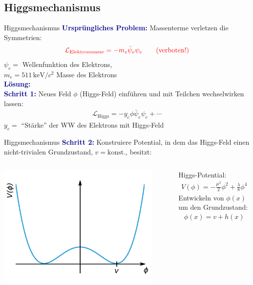 \documentclass[hyperref={pdfpagelabels=false},ngerman]{beamer}
\newcommand{\Lagr}{\mathcal{L}}
\renewcommand{\emph}[1]{\textbf{\textcolor{darkblue}{#1}}}
\begin{document}
\subsection{Higgsmechanismus}

\begin{frame}{Higgsmechanismus}
  \emph{Ursprüngliches Problem:} Massenterme verletzen die Symmetrien:
  \begin{align*}
    \textcolor{red}{\Lagr_{\text{Elektronmasse}} =
    - m_e \bar{\psi}_e \psi_e \qquad (\text{verboten!})}
  \end{align*}
  $\psi_e =$ Wellenfunktion des Elektrons,\\
  $m_e = 511\,\text{keV}/c^2$ Masse des Elektrons
  \\[1em]
  \emph{Lösung:}\\ \emph{Schritt 1:}
  Neues Feld $\phi$ (Higgs-Feld) einführen und mit Teilchen
  wechselwirken lassen:
  \begin{align*}
    \Lagr_{\text{Higgs}} = - y_e \phi \bar{\psi}_e \psi_e + \cdots
  \end{align*}
  $y_e =$ ``Stärke'' der WW des Elektrons mit Higgs-Feld
\end{frame}

\begin{frame}{Higgsmechanismus}
  \emph{Schritt 2:} Konstruiere Potential, in dem das Higgs-Feld einen
  nicht-trivialen Grundzustand, $v=\text{konst}.$, besitzt:
  \begin{columns}
    \begin{center}
      \includegraphics[width=0.9\textwidth]{images/higgs-potential}
    \end{center}
    Higgs-Potential:
    \begin{align*}
      V(\phi) = -\frac{\mu^2}{2} \phi^2 + \frac{\lambda}{8}\phi^4
    \end{align*}
    Entwickeln von $\phi(x)$ um den Grundzustand:
    \begin{align*}
      \phi(x) = v + h(x)
    \end{align*}
  \end{columns}
\end{frame}
\end{document}

